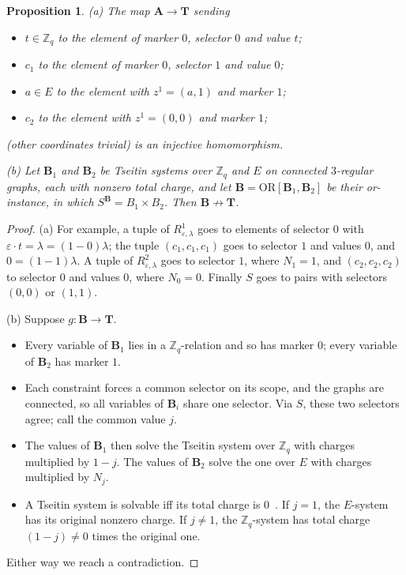 \documentclass[11pt]{article}
\newtheorem{proposition}[theorem]{Proposition}
\theoremstyle{definition}
\theoremstyle{remark}
\newcommand{\Z}{\mathbb Z}
\begin{document}
\begin{proposition}\label{prop:T}
(a) The map $\mathbf A\to\mathbf T$ sending
\begin{itemize}
\item $t\in\Z_q$ to the element of marker $0$, selector $0$ and value $t$;
\item $c_1$ to the element of marker $0$, selector $1$ and value $0$;
\item $a\in E$ to the element with $z^1=(a,1)$ and marker $1$;
\item $c_2$ to the element with $z^1=(0,0)$ and marker $1$;
\end{itemize}
(other coordinates trivial) is an injective homomorphism.

(b) Let $\mathbf B_1$ and $\mathbf B_2$ be Tseitin systems over $\Z_q$ and $E$
on connected $3$-regular graphs, each with nonzero total charge, and let
$\mathbf B=\mathrm{OR}[\mathbf B_1,\mathbf B_2]$ be their or-instance, in which
$S^{\mathbf B}=B_1\times B_2$. Then $\mathbf B\not\to\mathbf T$.
\end{proposition}
\begin{proof}
(a) For example, a tuple of $R^1_{\varepsilon,\lambda}$ goes to elements of
selector $0$ with $\varepsilon\cdot t=\lambda=(1-0)\lambda$; the tuple
$(c_1,c_1,c_1)$ goes to selector $1$ and values $0$, and $0=(1-1)\lambda$. A tuple
of $R^2_{\varepsilon,\lambda}$ goes to selector $1$, where $N_1=1$, and
$(c_2,c_2,c_2)$ to selector $0$ and values $0$, where $N_0=0$. Finally $S$ goes to
pairs with selectors $(0,0)$ or $(1,1)$.

(b) Suppose $g\colon\mathbf B\to\mathbf T$.
\begin{itemize}
\item Every variable of $\mathbf B_1$ lies in a $\Z_q$-relation and so has
marker $0$; every variable of $\mathbf B_2$ has marker $1$.
\item Each constraint forces a common selector on its scope, and the graphs are
connected, so all variables of $\mathbf B_i$ share one selector. Via $S$, these
two selectors agree; call the common value $j$.
\item The values of $\mathbf B_1$ then solve the Tseitin system over $\Z_q$ with
charges multiplied by $1-j$. The values of $\mathbf B_2$ solve the one over $E$
with charges multiplied by $N_j$.
\item A Tseitin system is solvable iff its total charge is
$0$~\cite[\S4]{LP25}. If $j=1$, the $E$-system has its original nonzero charge.
If $j\ne1$, the $\Z_q$-system has total charge $(1-j)\ne0$ times the original
one.
\end{itemize}
Either way we reach a contradiction.
\end{proof}
\end{document}

